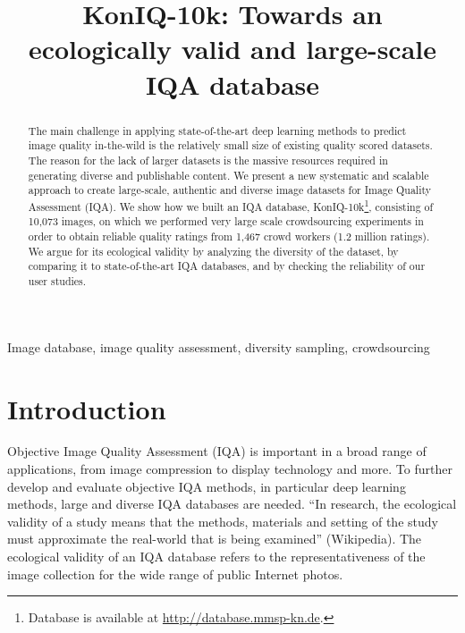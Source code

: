\documentclass{article}
\begin{document}
\sloppy

\def\x{{\mathbf x}}
\def\L{{\cal L}}


\title{K\MakeLowercase{on}IQ-10k: Towards an ecologically valid and large-scale IQA database}
\address{Department of Computer and Information Science, University of Konstanz, Germany\\
Email: \{hanhe.lin, vlad.hosu, dietmar.saupe\}@uni-konstanz.de}


\maketitle
\begin{abstract}
The main challenge in applying state-of-the-art deep learning methods to predict image quality in-the-wild is the relatively small size of existing quality scored datasets. The reason for the lack of larger datasets is the massive resources required in generating diverse and publishable content. We present a new systematic and scalable approach to create large-scale, authentic and diverse image datasets for Image Quality Assessment (IQA). We show how we built an IQA database, KonIQ-10k\footnote{Database is available at \url{http://database.mmsp-kn.de}.}, consisting of 10,073 images, on which we performed very large scale crowdsourcing experiments in order to obtain reliable quality ratings from  1,467 crowd workers (1.2 million ratings). We argue for its ecological validity by analyzing the  diversity of the dataset, by comparing it to state-of-the-art IQA databases, and by checking the reliability of our user studies.
\end{abstract}

\begin{keywords}
Image database, image quality assessment, diversity sampling, crowdsourcing
\end{keywords}


\section{Introduction}





Objective Image Quality Assessment (IQA) is important in a broad range of applications, from image compression to display technology and more. To further develop and evaluate objective IQA methods, in particular deep learning methods, large and diverse IQA databases are needed.  ``In research, the ecological validity of a study means that the methods, materials and setting of the study must approximate the real-world that is being examined'' (Wikipedia). The ecological validity of an IQA database refers to the representativeness of the image collection for the wide range of public Internet photos.
\end{document}
